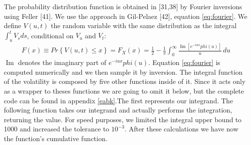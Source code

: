 \documentclass[12pt,oneside]{reedthesis}
\theoremstyle{definition}
\theoremstyle{definition}
\theoremstyle{remark}
\begin{document}
  The probability distribution function is obtained in {[}31,38{]} by
  Fourier inversions using Feller {[}41{]}. We use the approach in
  Gil-Pelaez {[}42{]}, equation \eqref{eq:fourier}. We define \(V(u,t)\) the
  random variable with the same distribution as the integral
  \(\int_{u}^{t}{V_s ds}\), conditional on \(V_u\) and \(V_t\):
  \begin{align} \label{eq:fourier}
  F(x) \equiv Pr \left\{ V(u,t) \leq x \right\} = F_{X}(x)={\frac {1}{2}}-{\frac {1}{\pi }}\int _{0}^{\infty }{\frac {\operatorname {Im} [e^{-iux} phi (u)]}{u}}\,du
  \end{align}
  \(\operatorname {Im}\) denotes the imaginary part of
  \(e^{-iux} phi (u)\). Equation \eqref{eq:fourier} is computed numerically
  and we then sample it by inversion. The integral function of the
  volatility is composed by five other functions inside of it. Since it
  acts only as a wrapper to theses functions we are going to omit it
  below, but the complete code can be found in appendix \ref{eabk}.The
  first represents our integrand. The following function takes our
  integrand and actually performs the integration, returning the value.
  For speed purposes, we limited the integral upper bound to 1000 and
  increased the tolerance to \(10^{-3}\). After these calculations we have
  now the function's cumulative function.
  
\end{document}
